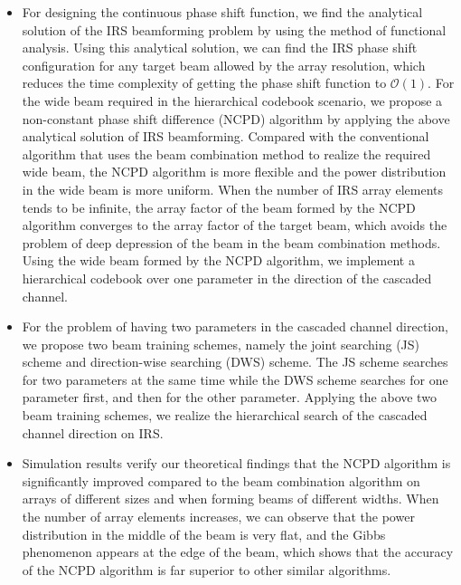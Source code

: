 \documentclass[12pt,draftclsnofoot,onecolumn]{IEEEtran}
\begin{document}
\begin{itemize}
		\item For designing the continuous phase shift function, we find the analytical solution of the IRS beamforming problem by using the method of functional analysis. Using this analytical solution, we can find the IRS phase shift configuration for any target beam allowed by the array resolution, which reduces the time complexity of getting the phase shift function to $\mathcal{O}(1)$. For the wide beam required in the hierarchical codebook scenario, we propose a non-constant phase shift difference (NCPD) algorithm by applying the above analytical solution of IRS beamforming. Compared with the conventional algorithm that uses the  beam combination method to realize the required wide beam, the NCPD algorithm is more flexible and the power distribution in the wide beam is more uniform. When the number of IRS array elements tends to be infinite, the array factor of the beam formed by the NCPD algorithm converges to the array factor of the target beam, which avoids the problem of deep depression of the beam  in the beam combination methods. Using the wide beam formed by the NCPD algorithm, we implement a hierarchical codebook over one parameter in the direction of the cascaded channel. 
		\item For the problem of having two parameters in the cascaded channel direction, we propose two beam training schemes, namely the  joint searching (JS) scheme and direction-wise  searching (DWS) scheme. The JS scheme searches for two parameters at the same time while the DWS scheme  searches for one parameter first, and then  for the other parameter. Applying the above two beam training schemes, we realize the hierarchical search of the cascaded channel direction on IRS.
		\item Simulation results verify our theoretical findings that the NCPD algorithm is significantly improved compared to the beam combination algorithm on arrays of different sizes and when forming beams of different widths. When the number of array elements increases, we can observe that the power distribution in the middle of the beam is very flat, and the Gibbs phenomenon appears at the edge of the beam, which shows that the accuracy of the NCPD algorithm is far superior to other similar algorithms.
		
		
		
	\end{itemize}
	
	
	
	
	
	
	
\end{document}
